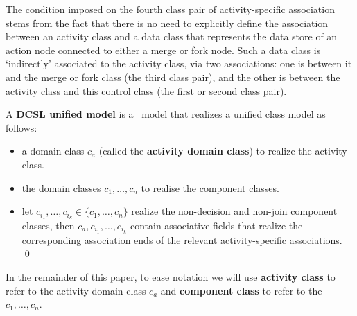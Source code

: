 The condition imposed on the fourth class pair of activity-specific association stems from the fact that there is no need to explicitly define the association between an activity class and a data class that represents the data store of an action node connected to either a merge or fork node. Such a data class is `indirectly' associated to the activity class, via two associations: one is between it and the merge or fork class (the third class pair), and the other is between the activity class and this control class (the first or second class pair).

\begin{definition} \label{def:unified-model}
	A \textbf{DCSL unified model} is a \dcsl~model that realizes a unified class model as follows:
	\begin{itemize}%
		\item a domain class $ c_a $ (called the \textbf{activity domain class}) to realize the activity class.
		\item the domain classes $ c_1,\dots,c_n $ to realise the component classes.
		\item let $ c_{i_1},\dots,c_{i_k} \in \{c_1,\dots,c_n\} $ realize the non-decision and non-join component classes, then $ c_a,c_{i_1},\dots,c_{i_k} $ contain associative fields that realize the corresponding association ends of the relevant activity-specific associations. \qed
	\end{itemize}
\end{definition}

In the remainder of this paper, to ease notation we will use \textbf{activity class} to refer to the activity domain class $ c_a $ and \textbf{component class} to refer to the $ c_1,\dots,c_n $. 

